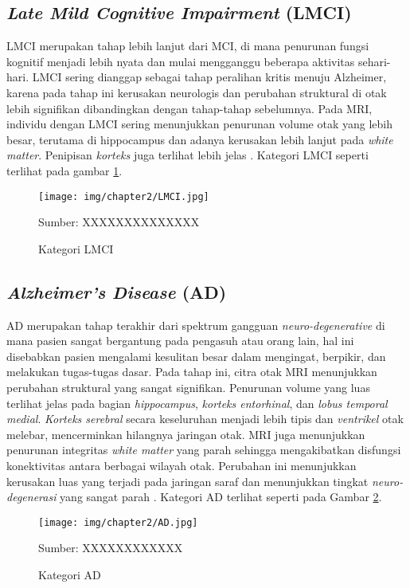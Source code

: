     \subsection{\textit{Late Mild Cognitive Impairment } (LMCI)}
    LMCI merupakan tahap lebih lanjut dari MCI, di mana penurunan fungsi kognitif menjadi lebih nyata dan mulai mengganggu beberapa aktivitas sehari-hari. LMCI sering dianggap sebagai tahap peralihan kritis menuju Alzheimer, karena pada tahap ini kerusakan neurologis dan perubahan struktural di otak lebih signifikan dibandingkan dengan tahap-tahap sebelumnya. Pada MRI, individu dengan LMCI sering menunjukkan penurunan volume otak yang lebih besar, terutama di hippocampus dan adanya kerusakan lebih lanjut pada \textit{white matter}. Penipisan \textit{korteks} juga terlihat lebih jelas \autocite{Prado2021}. Kategori LMCI seperti terlihat pada gambar \ref{fig:lmci}.
    \begin{figure}[H] 
        \begin{center} 
            \texttt{[image: img/chapter2/LMCI.jpg]}
            \caption{Kategori LMCI} 
            \label{fig:lmci}
            Sumber: XXXXXXXXXXXXXX
        \end{center} 
    \end{figure}

    \subsection{\textit{Alzheimer's Disease} (AD)}
    AD merupakan tahap terakhir dari spektrum gangguan \textit{neuro-degenerative} di mana pasien sangat bergantung pada pengasuh atau orang lain, hal ini disebabkan pasien mengalami kesulitan besar dalam mengingat, berpikir, dan melakukan tugas-tugas dasar. Pada tahap ini, citra otak MRI menunjukkan perubahan struktural yang sangat signifikan. Penurunan volume yang luas terlihat jelas pada bagian \textit{hippocampus}, \textit{korteks entorhinal}, dan \textit{lobus temporal medial}. \textit{Korteks serebral} secara keseluruhan menjadi lebih tipis dan \textit{ventrikel} otak melebar, mencerminkan hilangnya jaringan otak. MRI juga menunjukkan penurunan integritas \textit{white matter} yang parah sehingga mengakibatkan disfungsi konektivitas antara berbagai wilayah otak. Perubahan ini menunjukkan kerusakan luas yang terjadi pada jaringan saraf dan menunjukkan tingkat \textit{neuro-degenerasi} yang sangat parah \autocite{Yamanakkanavar2020}. Kategori AD terlihat seperti pada Gambar \ref{fig:ad}.
    \begin{figure}[H] 
        \begin{center} 
            \texttt{[image: img/chapter2/AD.jpg]}
            \caption{Kategori AD} 
            \label{fig:ad}
            Sumber: XXXXXXXXXXXX
        \end{center} 
    \end{figure}

